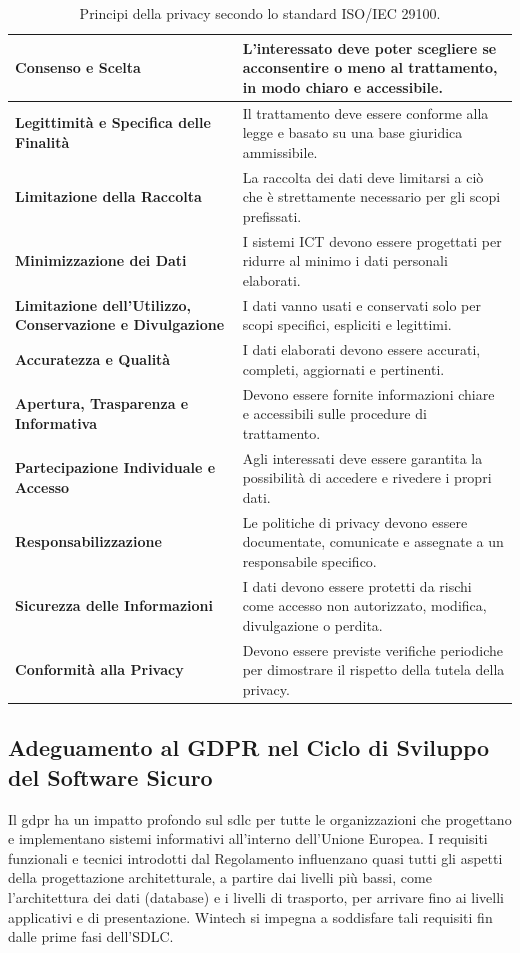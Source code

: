 \begin{longtable}{ >{\raggedright\arraybackslash}p{} p{} }
\bottomrule
\noalign{\vspace{10pt}}
\caption{Principi della privacy secondo lo standard ISO/IEC 29100.}
\label{tab:principi-privacy}
\endlastfoot
    \textbf{Consenso e Scelta} & L'interessato deve poter scegliere se acconsentire o meno al trattamento, in modo chiaro e accessibile.\\ \midrule
    \textbf{Legittimità e Specifica delle Finalità} & Il trattamento deve essere conforme alla legge e basato su una base giuridica ammissibile.\\ \midrule
    \textbf{Limitazione della Raccolta} & La raccolta dei dati deve limitarsi a ciò che è strettamente necessario per gli scopi prefissati.\\ \midrule
    \textbf{Minimizzazione dei Dati} & I sistemi ICT devono essere progettati per ridurre al minimo i dati personali elaborati.\\ \midrule
    \textbf{Limitazione dell'Utilizzo, Conservazione e Divulgazione} & I dati vanno usati e conservati solo per scopi specifici, espliciti e legittimi.\\ \midrule
    \textbf{Accuratezza e Qualità} & I dati elaborati devono essere accurati, completi, aggiornati e pertinenti.\\ \midrule
    \textbf{Apertura, Trasparenza e Informativa} & Devono essere fornite informazioni chiare e accessibili sulle procedure di trattamento.\\ \midrule
    \textbf{Partecipazione Individuale e Accesso} & Agli interessati deve essere garantita la possibilità di accedere e rivedere i propri dati.\\ \midrule
    \textbf{Responsabilizzazione} & Le politiche di privacy devono essere documentate, comunicate e assegnate a un responsabile specifico.\\ \midrule
    \textbf{Sicurezza delle Informazioni} & I dati devono essere protetti da rischi come accesso non autorizzato, modifica, divulgazione o perdita.\\ \midrule
    \textbf{Conformità alla Privacy} & Devono essere previste verifiche periodiche per dimostrare il rispetto della tutela della privacy.\\
\end{longtable}

\subsection{Adeguamento al GDPR nel Ciclo di Sviluppo del Software Sicuro}
Il \gls{gdpr} ha un impatto profondo sul \gls{sdlc} per tutte le organizzazioni che progettano e implementano sistemi informativi all'interno dell'Unione Europea. 
I requisiti funzionali e tecnici introdotti dal Regolamento influenzano quasi tutti gli aspetti della progettazione architetturale, a partire 
dai livelli più bassi, come l'architettura dei dati (database) e i livelli di trasporto, per arrivare fino ai livelli applicativi e di presentazione. 
Wintech si impegna a soddisfare tali requisiti fin dalle prime fasi dell'SDLC.

